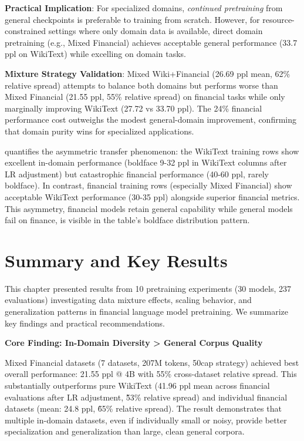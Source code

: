 \textbf{Practical Implication}: For specialized domains, \textit{continued pretraining} from general checkpoints is preferable to training from scratch. However, for resource-constrained settings where only domain data is available, direct domain pretraining (e.g., Mixed Financial) achieves acceptable general performance (33.7 ppl on WikiText) while excelling on domain tasks.

\textbf{Mixture Strategy Validation}: Mixed Wiki+Financial (26.69 ppl mean, 62\% relative spread) attempts to balance both domains but performs worse than Mixed Financial (21.55 ppl, 55\% relative spread) on financial tasks while only marginally improving WikiText (27.72 vs 33.70 ppl). The 24\% financial performance cost outweighs the modest general-domain improvement, confirming that domain purity wins for specialized applications.



 quantifies the asymmetric transfer phenomenon: the WikiText training rows show excellent in-domain performance (boldface 9-32 ppl in WikiText columns after LR adjustment) but catastrophic financial performance (40-60 ppl, rarely boldface). In contrast, financial training rows (especially Mixed Financial) show acceptable WikiText performance (30-35 ppl) alongside superior financial metrics. This asymmetry, financial models retain general capability while general models fail on finance, is visible in the table's boldface distribution pattern.

\section{Summary and Key Results}

This chapter presented results from 10 pretraining experiments (30 models, 237 evaluations) investigating data mixture effects, scaling behavior, and generalization patterns in financial language model pretraining. We summarize key findings and practical recommendations.

\textbf{Core Finding: In-Domain Diversity > General Corpus Quality}

Mixed Financial datasets (7 datasets, 207M tokens, 50cap strategy) achieved best overall performance: 21.55 ppl @ 4B with 55\% cross-dataset relative spread. This substantially outperforms pure WikiText (41.96 ppl mean across financial evaluations after LR adjustment, \~53\% relative spread) and individual financial datasets (mean: 24.8 ppl, \~65\% relative spread). The result demonstrates that multiple in-domain datasets, even if individually small or noisy, provide better specialization and generalization than large, clean general corpora.

